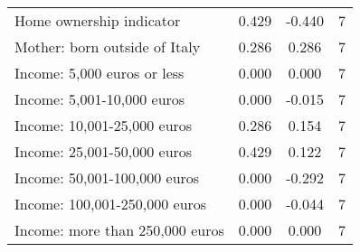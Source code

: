 \begin{table}[htbp]
\begin{tabular}{l*{1}{ccc}}
Home ownership indicator&       0.429\sym{**} &      -0.440&           7\\
Mother: born outside of Italy&       0.286\sym{***}&       0.286&           7\\
Income: 5,000 euros or less&       0.000         &       0.000&           7\\
Income: 5,001-10,000 euros&       0.000         &      -0.015&           7\\
Income: 10,001-25,000 euros&       0.286         &       0.154&           7\\
Income: 25,001-50,000 euros&       0.429         &       0.122&           7\\
Income: 50,001-100,000 euros&       0.000         &      -0.292&           7\\
Income: 100,001-250,000 euros&       0.000         &      -0.044&           7\\
Income: more than 250,000 euros&       0.000         &       0.000&           7\\
\bottomrule
\end{tabular}
\end{table}
